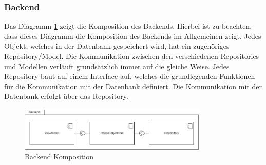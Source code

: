 \subsubsection{Backend}
Das Diagramm \ref*{fig:BackendKomposition} zeigt die Komposition des Backends. Hierbei ist zu beachten, dass dieses Diagramm die Komposition des Backends im Allgemeinen zeigt. Jedes Objekt, welches in der Datenbank gespeichert wird, hat ein zugehöriges Repository/Model. Die Kommunikation zwischen den verschiedenen Repositories und Modellen verläuft grundsätzlich immer auf die gleiche Weise. Jedes Repository baut auf einem Interface auf, welches die grundlegenden Funktionen für die Kommunikation mit der Datenbank definiert. Die Kommunikation mit der Datenbank erfolgt über das Repository.
\begin{figure}[H]
    \centering
    \includegraphics[width=0.8\textwidth]{images/diagramme/Backend.png}
    \caption{Backend Komposition}
    \label{fig:BackendKomposition}
\end{figure}
\newpage
